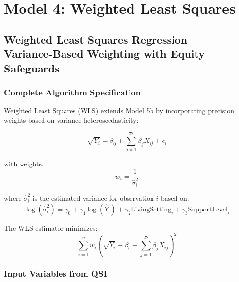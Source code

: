 \chapter{Model 4: Weighted Least Squares}\newpage

\section{Weighted Least Squares Regression\\Variance-Based Weighting with Equity Safeguards}


\subsection{Complete Algorithm Specification}

Weighted Least Squares (WLS) extends Model 5b by incorporating precision weights based on variance heteroscedasticity:

\begin{equation}
\sqrt{Y_i} = \beta_0 + \sum_{j=1}^{22} \beta_j X_{ij} + \epsilon_i
\end{equation}

with weights:
\begin{equation}
w_i = \frac{1}{\hat{\sigma}_i^2}
\end{equation}

where $\hat{\sigma}_i^2$ is the estimated variance for observation $i$ based on:
\begin{equation}
\log(\hat{\sigma}_i^2) = \gamma_0 + \gamma_1 \log(\hat{Y}_i) + \gamma_2 \text{LivingSetting}_i + \gamma_3 \text{SupportLevel}_i
\end{equation}

The WLS estimator minimizes:
\begin{equation}
\sum_{i=1}^n w_i \left(\sqrt{Y_i} - \beta_0 - \sum_{j=1}^{22} \beta_j X_{ij}\right)^2
\end{equation}

\subsection{Input Variables from QSI}

